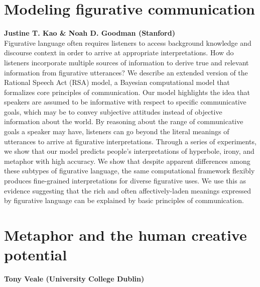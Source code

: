\documentclass[10pt,letterpaper]{article}
\begin{document}
\section{Modeling figurative communication}
\large \textbf{Justine T. Kao \& Noah D. Goodman (Stanford)}\\
Figurative language often requires listeners to access background knowledge and discourse context in order to arrive at appropriate interpretations. 
How do listeners incorporate multiple sources of information to derive true and relevant information from figurative utterances? We describe an extended version of the Rational Speech Act (RSA) model, a Bayesian computational model that formalizes core principles of communication. Our model highlights the idea that speakers are assumed to be informative with respect to specific communicative goals, which may be to convey subjective attitudes instead of objective information about the world. By reasoning about the range of communicative goals a speaker may have, listeners can go beyond the literal meanings of utterances to arrive at figurative interpretations. Through a series of experiments, we show that our model predicts people's interpretations of hyperbole, irony, and metaphor with high accuracy. We show that despite apparent differences among these subtypes of figurative language, the same computational framework flexibly produces fine-grained interpretations for diverse figurative uses. We use this as evidence suggesting that the rich and often affectively-laden meanings expressed by figurative language can be explained by basic principles of communication.


\section{Metaphor and the human creative potential}
\large \textbf{Tony Veale (University College Dublin)}
\end{document}

